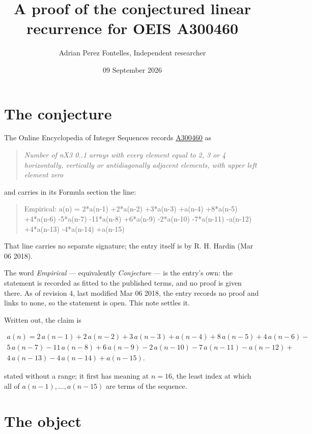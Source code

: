 \documentclass[11pt]{article}
\title{A proof of the conjectured linear recurrence for OEIS A300460}
\author{Adrian Perez Fontelles, Independent researcher}
\date{09 September 2026}
\theoremstyle{definition}
\begin{document}
\maketitle
\section{The conjecture}

The Online Encyclopedia of Integer Sequences records \href{https://oeis.org/A300460}{A300460} as

\begin{quote}\itshape Number of nX3 0..1 arrays with every element equal to 2, 3 or 4 horizontally, vertically or antidiagonally adjacent elements, with upper left element zero\end{quote}

and carries in its Formula section the line:

\begin{quote}\ttfamily Empirical: a(n) = 2*a(n-1) +2*a(n-2) +3*a(n-3) +a(n-4) +8*a(n-5) +4*a(n-6) -5*a(n-7) -11*a(n-8) +6*a(n-9) -2*a(n-10) -7*a(n-11) -a(n-12) +4*a(n-13) -4*a(n-14) +a(n-15)\end{quote}

That line carries no separate signature; the entry itself is by R. H. Hardin (Mar 06 2018).

The word {\itshape Empirical} --- equivalently {\itshape Conjecture} --- is the entry's own: the statement is recorded as fitted to the published terms, and no proof is given there. As of revision 4, last modified Mar 06 2018, the entry records no proof and links to none, so the statement is open. This note settles it.

Written out, the claim is

\begin{multline*} a(n) = 2\,a(n-1) + 2\,a(n-2) + 3\,a(n-3) + a(n-4) + 8\,a(n-5) + 4\,a(n-6) - \\ 5\,a(n-7) - 11\,a(n-8) + 6\,a(n-9) - 2\,a(n-10) - 7\,a(n-11) - a(n-12) + \\ 4\,a(n-13) - 4\,a(n-14) + a(n-15). \end{multline*}

stated without a range; it first has meaning at $n = 16$, the least index at which all of $a(n-1),\dots,a(n-15)$ are terms of the sequence.

\section{The object}
\end{document}
